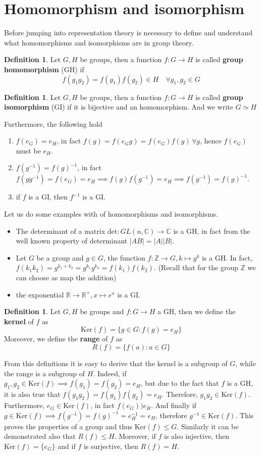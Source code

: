\documentclass[12pt]{book}
\theoremstyle{plain}
\newcommand{\R}{\mathbb{R}}
\newcommand{\Z}{\mathbb{Z}}
\newcommand{\C}{\mathbb{C}}
\theoremstyle{definition}
\newtheorem{dfn}[thm]{Definition}
\theoremstyle{remark}
\begin{document}
\section{Homomorphism and isomorphism}
Before jumping into representation theory is necessary to define and understand what homomorphisms and isomorphisms are in group theory.
\begin{dfn}
Let $G,H$ be groups, then a function $f:G\to H$ is called \textbf{group homomorphism} (GH) if
\[f(g_1g_2) = f(g_1)f(g_2)\in H\quad \forall g_1,g_2\in G\]
\end{dfn}
\begin{dfn}
Let $G,H$ be groups, then a function $f:G\to H$ is called \textbf{group isomorphism} (GI) if it is bijective and an homomorphism. And we write $G\simeq H$
\end{dfn}
Furthermore, the following hold
\begin{enumerate}
	\item $f(e_G) = e_H$, in fact $f(g) = f(e_Gg)=f(e_G)f(g)\,\forall g$, hence $f(e_G)$ must be $e_H$.
	\item $f(g^{-1}) = f(g)^{-1}$, in fact $f(gg^{-1})=f(e_G) = e_H \implies f(g)f(g^{-1}) = e_H \implies f(g^{-1}) = f(g)^{-1}$.
	\item if $f$ is a GI, then $f^{-1}$ is a GI.
\end{enumerate}
Let us do some examples with of homomorphisms and isomorphisms.
\begin{itemize}
\item The determinant of a matrix $\text{det}:GL(n,\C) \to \C$ is a GH, in fact from the well known property of determinant $|AB| = |A||B|$.
\item Let $G$ be a group and $g\in G$, the function $f:\Z \to G,k\mapsto g^k$ is a GH. In fact, $f(k_1k_2) = g^{k_1+k_2} = g^{k_1}g^{k_2} = f(k_1)f(k_2)$. (Recall that for the group $\Z$ we can choose as map the addition)
\item the exponential $\R\to \R^+, x\mapsto e^x$ is a GI.
\end{itemize}
\begin{dfn}
Let $G,H$ be groups and $f:G\to H$ a GH, then we define the \textbf{kernel} of $f$ as
\[\text{Ker}(f) = \{g\in G:f(g)=e_H\}\]
Moreover, we define the \textbf{range} of $f$ as
\[R(f) = \{f(a):a\in G\}\]
\end{dfn}
From this definitions it is easy to derive that the kernel is a subgroup of $G$, while the range is a subgroup of $H$. Indeed, if $g_1,g_2\in \text{Ker}(f)\implies f(g_1)=f(g_2)=e_H$, but due to the fact that $f$ is a GH, it is also true that $f(g_1g_2) = f(g_1)f(g_2)=e_H$. Therefore, $g_1g_2\in \text{Ker}(f)$. Furthermore, $e_G\in \text{Ker}(f)$, in fact $f(e_G) ) e_H$. And finally if $g\in \text{Ker}(f)\implies f(g^{-1}) = f(g)^{-1} = e_H^{-1} = e_H$, therefore $g^{-1}\in\text{Ker}(f)$. This proves the properties of a group and thus $\text{Ker}(f)\leq G$. Similarly it can be demonstrated also that $R(f)\leq H$. Moreover, if $f$ is also injective, then $\text{Ker}(f) = \{e_G\}$ and if $f$ is surjective, then $R(f) = H$. \\
\end{document}
